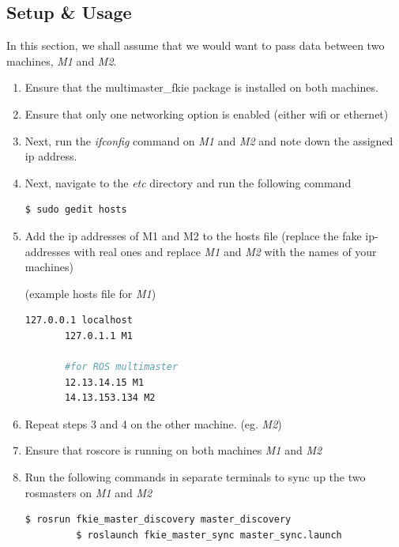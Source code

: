 \documentclass[11pt]{article}
\begin{document}
\subsection{Setup \& Usage}

In this section, we shall assume that we would want to pass data between two machines, \emph{M1} and \emph{M2}.

\begin{enumerate}
 \item {
       Ensure that the multimaster\_fkie package is installed on both machines.
       }
 \item {
       Ensure that only one networking option is enabled (either wifi or ethernet)
       }
 \item{
       Next, run the \emph{ifconfig} command on \emph{M1} and \emph{M2} and note down the  assigned ip address.
       }
 \item{
       Next, navigate to the \emph{etc} directory and run the following command
       \begin{lstlisting}[language=bash]
        $ sudo gedit hosts
        \end{lstlisting}
       }
 \item{
       Add the ip addresses of M1 and M2 to the hosts file (replace the fake ip-addresses with real ones and replace \emph{M1} and \emph{M2} with the names of your machines)

       (example hosts file for \emph{M1})
       \begin{lstlisting}[language=bash]
       127.0.0.1 localhost
       127.0.1.1 M1

       #for ROS multimaster
       12.13.14.15 M1
       14.13.153.134 M2
        \end{lstlisting}
       }
 \item{
       Repeat steps 3 and 4 on  the other machine. (eg. \emph{M2})
       }
 \item{
       Ensure that roscore is running on both machines \emph{M1} and \emph{M2}
       }
 \item{
       Run the following commands in separate terminals to sync up the two rosmasters on \emph{M1} and \emph{M2}
       \begin{lstlisting}[language=bash]
         $ rosrun fkie_master_discovery master_discovery
         $ roslaunch fkie_master_sync master_sync.launch
        \end{lstlisting}

       }
\end{enumerate}
\end{document}
